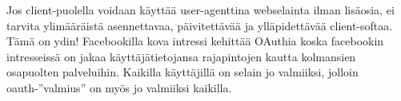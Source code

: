 \documentclass[finnish,gradu]{tktltiki}
\begin{document}
  Jos client-puolella voidaan käyttää user-agenttina webselainta ilman lisäosia, ei tarvita ylimääräistä asennettavaa, päivitettävää ja ylläpidettävää client-softaa. Tämä on ydin! Facebookilla kova intressi kehittää OAuthia koska facebookin intresseissä on jakaa käyttäjätietojansa rajapintojen kautta kolmansien osapuolten palveluihin. Kaikilla käyttäjillä on selain jo valmiiksi, jolloin oauth-''valmius'' on myös jo valmiiksi kaikilla.







\lastpage
\end{document}

